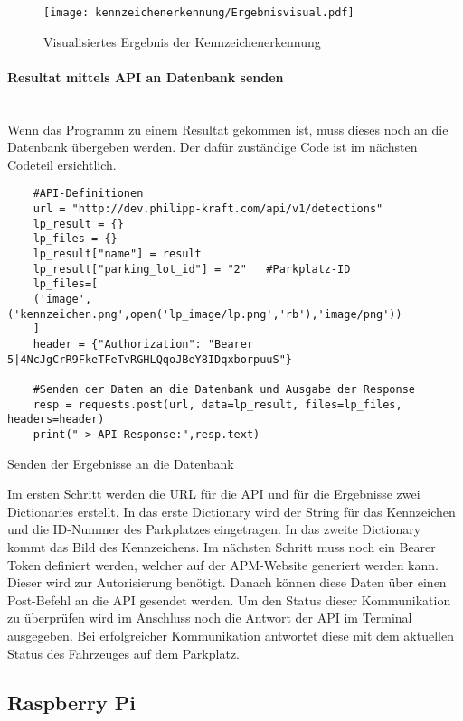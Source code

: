 \begin{figure}[H]
    \centering
    \texttt{[image: kennzeichenerkennung/Ergebnisvisual.pdf]}
    \caption{Visualisiertes Ergebnis der Kennzeichenerkennung}
\end{figure}

\paragraph{Resultat mittels API an Datenbank senden}\mbox{}\\

Wenn das Programm zu einem Resultat gekommen ist, muss dieses noch an die Datenbank übergeben werden. Der dafür zuständige Code ist im nächsten Codeteil ersichtlich.

\begin{longlisting}
    \begin{verbatim}
    #API-Definitionen
    url = "http://dev.philipp-kraft.com/api/v1/detections"
    lp_result = {}
    lp_files = {}
    lp_result["name"] = result 
    lp_result["parking_lot_id"] = "2"   #Parkplatz-ID 
    lp_files=[
    ('image',('kennzeichen.png',open('lp_image/lp.png','rb'),'image/png'))
    ]
    header = {"Authorization": "Bearer 5|4NcJgCrR9FkeTFeTvRGHLQqoJBeY8IDqxborpuuS"}

    #Senden der Daten an die Datenbank und Ausgabe der Response
    resp = requests.post(url, data=lp_result, files=lp_files, headers=header)
    print("-> API-Response:",resp.text)
    \end{verbatim}
    \caption{Senden der Ergebnisse an die Datenbank}
\end{longlisting}

Im ersten Schritt werden die URL für die API und für die Ergebnisse zwei Dictionaries erstellt. In das erste Dictionary wird der String für das Kennzeichen 
und die ID-Nummer des Parkplatzes eingetragen. In das zweite Dictionary kommt das Bild des Kennzeichens. Im nächsten Schritt muss noch ein Bearer Token 
definiert werden, welcher auf der APM-Website generiert werden kann. Dieser wird zur Autorisierung benötigt. Danach können diese Daten über einen Post-Befehl 
an die API gesendet werden. Um den Status dieser Kommunikation zu überprüfen wird im Anschluss noch die Antwort der API im Terminal ausgegeben. Bei 
erfolgreicher Kommunikation antwortet diese mit dem aktuellen Status des Fahrzeuges auf dem Parkplatz.

\subsection{Raspberry Pi}

